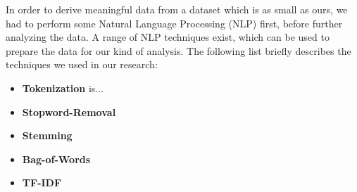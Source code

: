 In order to derive meaningful data from a dataset which is as small as ours, we had to perform some Natural Language Processing (NLP) first, before further analyzing the data. A range of NLP techniques exist, which can be used to prepare the data for our kind of analysis\cite{solangi_review_2018}\cite{ferrari_natural_2018}. The following list briefly describes the techniques we used in our research:

\begin{itemize}
	\item \textbf{Tokenization} is...
	\item \textbf{Stopword-Removal}
	\item \textbf{Stemming}
	\item \textbf{Bag-of-Words}
	\item \textbf{TF-IDF}
\end{itemize}